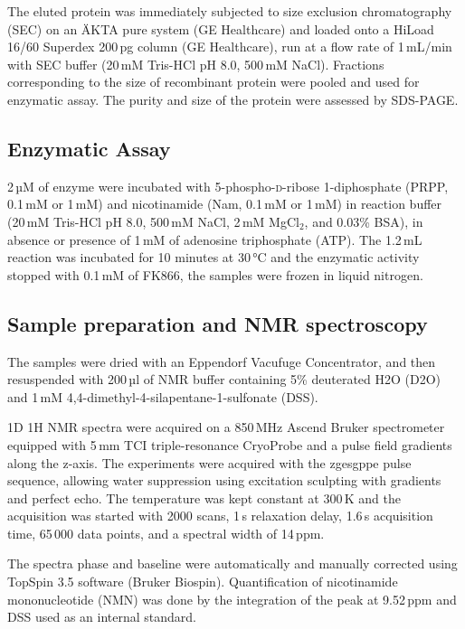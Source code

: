 The eluted protein was immediately subjected to size exclusion chromatography (SEC) on an ÄKTA pure system (GE Healthcare) and loaded onto a HiLoad 16/60 Superdex 200\,pg column (GE Healthcare), run at a flow rate of 1\,mL/min with SEC buffer (20\,mM Tris-HCl pH 8.0, 500\,mM NaCl). Fractions corresponding to the size of recombinant protein were pooled and used for enzymatic assay. The purity and size of the protein were assessed by SDS-PAGE.


\subsection{Enzymatic Assay}

2\,µM of enzyme were incubated with 5-phospho-\textsc{d}-ribose 1-diphosphate (PRPP, 0.1\,mM or 1\,mM) and nicotinamide (Nam, 0.1\,mM or 1\,mM) in reaction buffer (20\,mM Tris-HCl pH 8.0, 500\,mM NaCl, 2\,mM MgCl$_{2}$, and 0.03\% BSA), in absence or presence of 1\,mM of adenosine triphosphate (ATP). The 1.2\,mL reaction was incubated for 10 minutes at 30\,°C and the enzymatic activity stopped with 0.1\,mM of FK866, the samples were frozen in liquid nitrogen.


\subsection{Sample preparation and NMR spectroscopy}

The samples were dried with an Eppendorf Vacufuge Concentrator, and then resuspended with 200\,µl of NMR buffer containing 5\% deuterated H2O (D2O) and 1\,mM 4,4-dimethyl-4-silapentane-1-sulfonate (DSS).

1D 1H NMR spectra were acquired on a 850\,MHz Ascend Bruker spectrometer equipped with 5\,mm TCI triple-resonance CryoProbe and a pulse field gradients along the z-axis. The experiments were acquired with the zgesgppe pulse sequence, allowing water suppression using excitation sculpting with gradients and perfect echo. The temperature was kept constant at 300\,K and the acquisition was started with 2000 scans, 1\,s relaxation delay, 1.6\,s acquisition time, 65\,000 data points, and a spectral width of 14\,ppm.

The spectra phase and baseline were automatically and manually corrected using TopSpin 3.5 software (Bruker Biospin). Quantification of nicotinamide mononucleotide (NMN) was done by the integration of the peak at 9.52\,ppm and DSS used as an internal standard.


